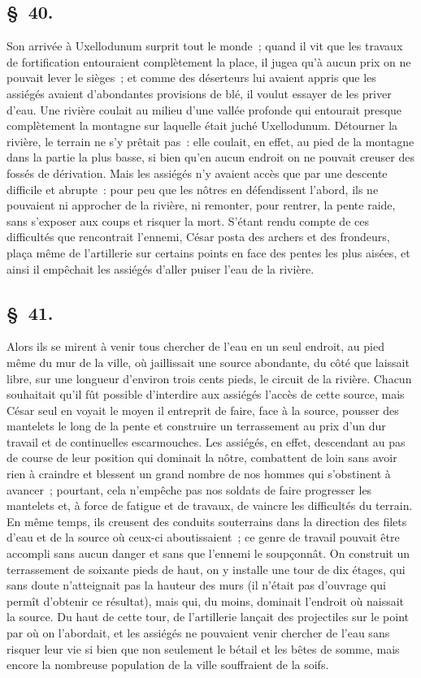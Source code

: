 \documentclass[french,twoside]{book} %
\begin{document}
\subsection[{§ 40.}]{ \textsc{§ 40.} }
\noindent Son arrivée à Uxellodunum surprit tout le monde ; quand il vit que les travaux de fortification entouraient complètement la place, il jugea qu’à aucun prix on ne pouvait lever le sièges ; et comme des déserteurs lui avaient appris que les assiégés avaient d’abondantes provisions de blé, il voulut essayer de les priver d’eau. Une rivière coulait au milieu d’une vallée profonde qui entourait presque complètement la montagne sur laquelle était juché Uxellodunum. Détourner la rivière, le terrain ne s’y prêtait pas : elle coulait, en effet, au pied de la montagne dans la partie la plus basse, si bien qu’en aucun endroit on ne pouvait creuser des fossés de dérivation. Mais les assiégés n’y avaient accès que par une descente difficile et abrupte : pour peu que les nôtres en défendissent l’abord, ils ne pouvaient ni approcher de la rivière, ni remonter, pour rentrer, la pente raide, sans s’exposer aux coups et risquer la mort. S'étant rendu compte de ces difficultés que rencontrait l’ennemi, César posta des archers et des frondeurs, plaça même de l’artillerie sur certains points en face des pentes les plus aisées, et ainsi il empêchait les assiégés d’aller puiser l’eau de la rivière.
\subsection[{§ 41.}]{ \textsc{§ 41.} }
\noindent Alors ils se mirent à venir tous chercher de l’eau en un seul endroit, au pied même du mur de la ville, où jaillissait une source abondante, du côté que laissait libre, sur une longueur d’environ trois cents pieds, le circuit de la rivière. Chacun souhaitait qu’il fût possible d’interdire aux assiégés l’accès de cette source, mais César seul en voyait le moyen il entreprit de faire, face à la source, pousser des mantelets le long de la pente et construire un terrassement au prix d’un dur travail et de continuelles escarmouches. Les assiégés, en effet, descendant au pas de course de leur position qui dominait la nôtre, combattent de loin sans avoir rien à craindre et blessent un grand nombre de nos hommes qui s’obstinent à avancer ; pourtant, cela n’empêche pas nos soldats de faire progresser les mantelets et, à force de fatigue et de travaux, de vaincre les difficultés du terrain. En même temps, ils creusent des conduits souterrains dans la direction des filets d’eau et de la source où ceux-ci aboutissaient ; ce genre de travail pouvait être accompli sans aucun danger et sans que l’ennemi le soupçonnât. On construit un terrassement de soixante pieds de haut, on y installe une tour de dix étages, qui sans doute n’atteignait pas la hauteur des murs (il n’était pas d’ouvrage qui permît d’obtenir ce résultat), mais qui, du moins, dominait l’endroit où naissait la source. Du haut de cette tour, de l’artillerie lançait des projectiles sur le point par où on l’abordait, et les assiégés ne pouvaient venir chercher de l’eau sans risquer leur vie si bien que non seulement le bétail et les bêtes de somme, mais encore la nombreuse population de la ville souffraient de la soifs.
\end{document}
